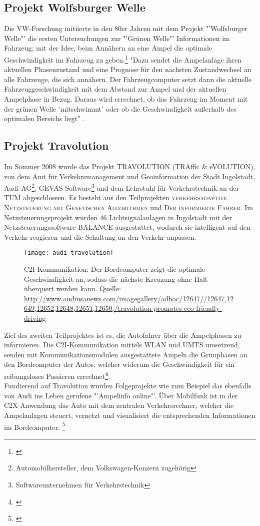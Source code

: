 \subsection{Projekt Wolfsburger Welle}
Die \gls{VW}-Forschung initiierte in den 80er Jahren mit dem Projekt "'Wolfsburger Welle"' die ersten Untersuchungen zur "'Grünen Welle"' Informationen im Fahrzeug; mit der Idee, beim Annähern an eine Ampel die optimale Geschwindigkeit im Fahrzeug zu geben.\footnote{\cite{Welle}} "Dazu sendet die Ampelanlage ihren aktuellen Phasenzustand und eine Prognose für den nächsten Zustandwechsel an alle Fahrzeuge, die sich annähern. Der Fahrzeugcomputer setzt dann die aktuelle Fahrzeuggeschwindigkeit mit dem Abstand zur Ampel und der aktuellen Ampelphase in Bezug. Daraus wird errechnet, ob das Fahrzeug im Moment mit der grünen Welle ’mitschwimmt’ oder ob die Geschwindigkeit außerhalb des optimalen Bereichs liegt" \cite{MenschMaschine}.
\subsection{Projekt Travolution}
Im Sommer 2008 wurde das Projekt TRAVOLUTION (TRAffic \& eVOLUTION), von dem Amt für Verkehrsmanagement und Geoinformation der Stadt Ingolstadt, Audi AG\footnote{ Automobilhersteller, dem Volkswagen-Konzern zugehörig}, GEVAS Software\footnote{ Softwareunternehmen für Verkehrstechnik} und dem Lehrstuhl für Verkehrstechnik an der \gls{TUM} abgeschlossen. Es besteht aus den Teilprojekten \textsc{verkehrsadaptive Netzsteuerung mit Genetischen Algorithmen} und \textsc{Der informierte Fahrer}. Im Netzsteuerungsprojekt wurden 46 Lichtsignalanlagen in Ingolstadt mit der Netzsteuerungssoftware BALANCE ausgestattet, wodurch sie intelligent auf den Verkehr reagieren und die Schaltung an den Verkehr anpassen. 
\begin{figure}[H]  
    \centering  
    \texttt{[image: audi-travolution]}  \label{fig:travolution}
    \caption[Projekt Travolution]{\gls{C2I}-Kommunikation: Der Bordcomputer zeigt die optimale Geschwindigkeit an, sodass die nächste Kreuzung ohne Halt überquert werden kann. Quelle: {\url{http://www.audiusanews.com/imagegallery/adhoc/12647//12647,12649,12652,12648,12651,12650,/travolution-promotes-eco-friendly-driving}}}
\end{figure}
Ziel des zweiten Teilprojektes ist es, die Autofahrer über die Ampelphasen zu informieren. Die \gls{C2I}-Kommunikation mittels \gls{WLAN} und \gls{UMTS} umsetzend, senden mit Kommunikationsmodulen ausgestattete Ampeln die Grünphasen an den Bordcomputer der Autos, welcher widerum die Geschwindigkeit für ein reibungsloses Passieren errechnet\footnote{\cite{Travolution, AudiTravolution}}.\\ 
Fundierend auf Travolution wurden Folgeprojekte wie zum Beispiel das ebenfalls von Audi ins Leben gerufene "'Ampelinfo online"'. Über Mobilfunk ist in der \gls{C2X}-Anwendung das Auto mit dem zentralen Verkehrsrechner, welcher die Ampelanlagen steuert, vernetzt und visualisiert die entsprechenden Informationen im Bordcomputer. \footnote{\cite{Ampelinfo}}
